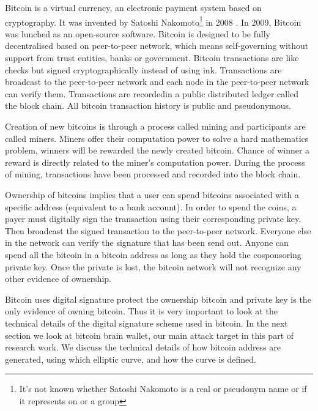 Bitcoin is a virtual currency, an electronic payment system based on cryptography. It was invented by Satoshi Nakomoto\footnote{It's not known whether Satoshi Nakomoto is a real or pseudonym name or if it represents on or a group} in 2008 \cite{nakamoto2008bitcoin}. In 2009, Bitcoin was lunched as an open-source software. Bitcoin is designed to be fully decentralised based on peer-to-peer network, which means self-governing without support from trust entities, banks or government. Bitcoin transactions are like checks but signed cryptographically instead of using ink. Transactions are broadcast to the peer-to-peer network and each node in the peer-to-peer network can verify them. Transactions are recordedin a public distributed ledger called the block chain. All bitcoin transaction history is public and pseudonymous.

Creation of new bitcoins is through a process called mining and participants are called miners. Miners offer their computation power to solve a hard mathematics problem, winners will be rewarded the newly created bitcoin. Chance of winner a reward is directly related to the miner's computation power. During the process of mining, transactions have been processed and recorded into the block chain. 

Ownership of bitcoins implies that a user can spend bitcoins associated with a specific address (equivalent to a bank account). In order to spend the coins, a payer must digitally sign the transaction using their corresponding private key. Then broadcast the signed transaction to the peer-to-peer network. Everyone else in the network can verify the signature that has been send out. Anyone can spend all the bitcoin in a bitcoin address as long as they hold the cosponsoring private key. Once the private is lost, the bitcoin network will not recognize any other evidence of ownership.

Bitcoin uses digital signature protect the ownership bitcoin and private key is the only evidence of owning bitcoin. Thus it is very important to look at the technical details of the digital signature scheme used in bitcoin. In the next section we look at bitcoin brain wallet, our main attack target in this part of research work. We discuss the technical details of how bitcoin address are generated, using which elliptic curve, and how the curve is defined.

